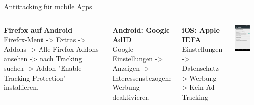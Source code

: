 \begin{frame}{Antitracking für mobile Apps}
	\begin{columns}
		\column{5.5cm}
		\footnotesize
		\textbf{Firefox auf Android}\\
		Firefox-Menü -> Extras -> Addons -> Alle Firefox-Addons ansehen -> nach Tracking suchen -> Addon "Enable Tracking Protection" installieren.

		\textbf{Android: Google AdID}\\
		Google-Einstellungen -> Anzeigen -> Interessensbezogene Werbung deaktivieren\\
		\vspace{0.5cm}

		\textbf{iOS: Apple IDFA}\\
		Einstellungen -> Datenschutz -> Werbung -> Kein Ad-Tracking\\
		\vspace{0.5cm}

		\column{5cm}

		\begin{center}
			\includegraphics[width=3.5cm]{../../img/google-adid.png}
		\par\end{center}
	\end{columns}
\end{frame}
